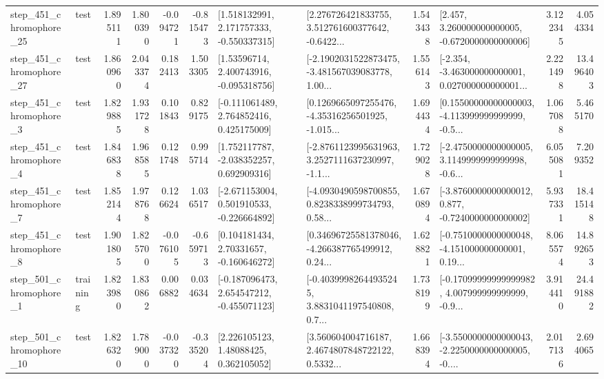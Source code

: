 \begin{tabular}{llrrrrllrlrr}
  step\_451\_chromophore\_25 &      test &      1.895111 &    1.800390 &     -0.094721 & -0.815473 &    [1.518132991, 2.171757333, -0.550337315] &  [2.276726421833755, 3.512761600377642, -0.6422... &       1.543438 &    [2.457, 3.260000000000005, -0.6720000000000006] &            3.122345 &          4.054334 \\
  step\_451\_chromophore\_27 &      test &      1.860960 &    2.043374 &      0.182413 &  1.503305 &     [1.53596714, 2.400743916, -0.095318756] &  [-2.1902031522873475, -3.481567039083778, 1.00... &       1.556143 &  [-2.354, -3.463000000000001, 0.027000000000001... &            2.221498 &         13.496403 \\
   step\_451\_chromophore\_3 &      test &      1.829885 &    1.931728 &      0.101843 &  0.829175 &    [-0.111061489, 2.764852416, 0.425175009] &  [0.1269665097255476, -4.35316256501925, -1.015... &       1.694434 &  [0.15500000000000003, -4.113999999999999, -0.5... &            1.067088 &          5.465170 \\
   step\_451\_chromophore\_4 &      test &      1.846838 &    1.968585 &      0.121748 &  0.995714 &    [1.752117787, -2.038352257, 0.692909316] &  [-2.8761123995631963, 3.2527111637230997, -1.1... &       1.729028 &  [-2.4750000000000005, 3.1149999999999998, -0.6... &            6.055081 &          7.209352 \\
   step\_451\_chromophore\_7 &      test &      1.852144 &    1.978768 &      0.126624 &  1.036517 &   [-2.671153004, 0.501910533, -0.226664892] &  [-4.0930490598700855, 0.8238338999734793, 0.58... &       1.670894 &  [-3.8760000000000012, 0.877, -0.7240000000000002] &            5.937331 &         18.415148 \\
   step\_451\_chromophore\_8 &      test &      1.901805 &    1.825700 &     -0.076105 & -0.659713 &     [0.104181434, 2.70331657, -0.160646272] &  [0.34696725581378046, -4.266387765499912, 0.24... &       1.628821 &  [-0.7510000000000048, -4.151000000000001, 0.19... &            8.065574 &         14.892653 \\
   step\_501\_chromophore\_1 &  training &      1.823980 &    1.830862 &      0.006882 &  0.034634 &   [-0.187096473, 2.654547212, -0.455071123] &  [-0.40399982644935245, 3.8831041197540808, 0.7... &       1.738199 &  [-0.17099999999999982, 4.007999999999999, -0.9... &            3.914410 &         24.491882 \\
  step\_501\_chromophore\_10 &      test &      1.826320 &    1.789000 &     -0.037320 & -0.335204 &      [2.226105123, 1.48088425, 0.362105052] &  [3.560604004716187, 2.4674807848722122, 0.5332... &       1.668394 &  [-3.5500000000000043, -2.2250000000000005, -0.... &            2.017136 &          2.694065 \\

\end{tabular}
